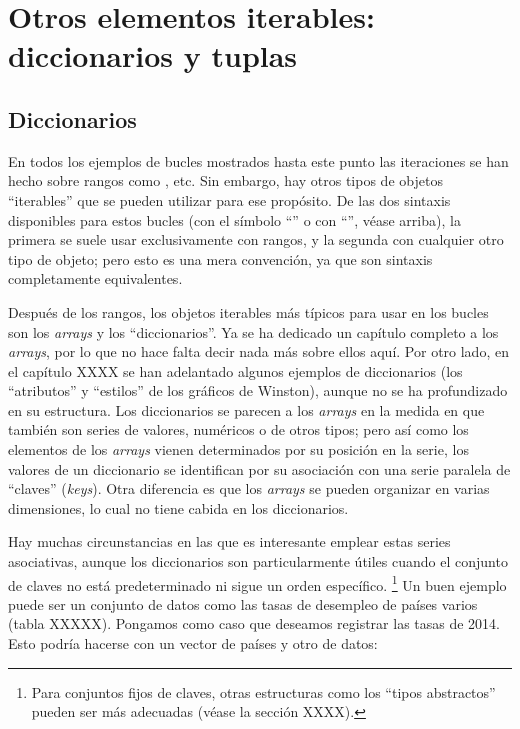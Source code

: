 \chapter{Otros elementos iterables: diccionarios y tuplas}

\section{Diccionarios}

En todos los ejemplos de bucles  mostrados hasta este punto las iteraciones se han hecho sobre rangos como , etc. Sin embargo, hay otros tipos de objetos ``iterables'' que se pueden utilizar para ese propósito. De las dos sintaxis disponibles para estos bucles (con el símbolo ``\code{=}'' o con ``'', véase arriba), la primera se suele usar exclusivamente con rangos, y la segunda con cualquier otro tipo de objeto; pero esto es una mera convención, ya que son sintaxis completamente equivalentes.

Después de los rangos, los objetos iterables más típicos para usar en los bucles  son los \emph{arrays} y los ``diccionarios''. Ya se ha dedicado un capítulo completo a los \emph{arrays}, por lo que no hace falta decir nada más sobre ellos aquí. Por otro lado, en el capítulo XXXX se han adelantado algunos ejemplos de diccionarios (los ``atributos'' y ``estilos'' de los gráficos de Winston), aunque no se ha profundizado en su estructura. Los diccionarios se parecen a los \emph{arrays} en la medida en que también son series de valores, numéricos o de otros tipos; pero así como los elementos de los \emph{arrays} vienen determinados por su posición en la serie, los valores de un diccionario se identifican por su asociación con una serie paralela de ``claves'' (\emph{keys}). Otra diferencia es que los \emph{arrays} se pueden organizar en varias dimensiones, lo cual no tiene cabida en los diccionarios.

Hay muchas circunstancias en las que es interesante emplear estas series asociativas, aunque los diccionarios son particularmente útiles cuando el conjunto de claves no está predeterminado ni sigue un orden específico.%
\footnote{%
Para conjuntos fijos de claves, otras estructuras como los ``tipos abstractos'' pueden ser más adecuadas (véase la sección XXXX).%
}
Un buen ejemplo puede ser un conjunto de datos como las tasas de desempleo de países varios (tabla XXXXX). Pongamos como caso que deseamos registrar las tasas de 2014. Esto podría hacerse con un vector de países y otro de datos:

